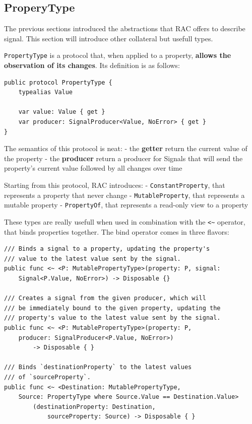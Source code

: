 \subsection{ProperyType}\label{properytype}

The previous sections introduced the abstractions that RAC offers to
describe signal. This section will introduce other collateral but
usefull types.

\texttt{PropertyType} is a protocol that, when applied to a property,
\textbf{allows the observation of its changes}. Its definition is as
follows:

\begin{verbatim}
public protocol PropertyType {
    typealias Value

    var value: Value { get }
    var producer: SignalProducer<Value, NoError> { get }
}
\end{verbatim}

The semantics of this protocol is neat: - the \textbf{getter} return the
current value of the property - the \textbf{producer} return a producer
for Signals that will send the property's current value followed by all
changes over time

Starting from this protocol, RAC introduces: -
\texttt{ConstantProperty}, that represents a property that never change
- \texttt{MutableProperty}, that represents a mutable property -
\texttt{PropertyOf}, that represents a read-only view to a property

These types are really usefull when used in combination with the
\texttt{\textless{}\textasciitilde{}} operator, that binds properties
together. The bind operator comes in three flavors:

\begin{verbatim}
/// Binds a signal to a property, updating the property's
/// value to the latest value sent by the signal.
public func <~ <P: MutablePropertyType>(property: P, signal: 
	Signal<P.Value, NoError>) -> Disposable {}

/// Creates a signal from the given producer, which will 
/// be immediately bound to the given property, updating the 
/// property's value to the latest value sent by the signal.
public func <~ <P: MutablePropertyType>(property: P, 
	producer: SignalProducer<P.Value, NoError>) 
		-> Disposable { }

/// Binds `destinationProperty` to the latest values 
/// of `sourceProperty`.
public func <~ <Destination: MutablePropertyType, 
	Source: PropertyType where Source.Value == Destination.Value>
		(destinationProperty: Destination, 
			sourceProperty: Source) -> Disposable { }
\end{verbatim}

